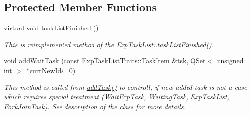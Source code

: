 \subsection*{Protected Member Functions}
\begin{DoxyCompactItemize}
\item 
virtual void \hyperlink{class_wait_task_list_aa0749dc369379ff737fdf14a89142bd2}{task\+List\+Finished} ()
\begin{DoxyCompactList}\small\item\em This is reimplemented method of the \hyperlink{class_exp_task_list_adee3f2e0894b5b102b2fcf0cff4ff25a}{Exp\+Task\+List\+::task\+List\+Finished()}. \end{DoxyCompactList}\item 
void \hyperlink{class_wait_task_list_a2724cb9d9e7f897a4bf0c44054ad2c29}{add\+Wait\+Task} (const \hyperlink{struct_exp_task_list_traits_1_1_task_item}{Exp\+Task\+List\+Traits\+::\+Task\+Item} \&tsk, Q\+Set$<$ unsigned int $>$ $\ast$curr\+New\+Ids=0)
\begin{DoxyCompactList}\small\item\em This method is called from \hyperlink{class_wait_task_list_a429d0b45f82a2eef00c5dacffbbc1f70}{add\+Task()} to controll, if new added task is not a case which requires special treatment (\hyperlink{class_wait_exp_task}{Wait\+Exp\+Task}, \hyperlink{class_waiting_task}{Waiting\+Task}, \hyperlink{class_exp_task_list}{Exp\+Task\+List}, \hyperlink{class_fork_join_task}{Fork\+Join\+Task}). See description of the class for more details. \end{DoxyCompactList}\end{DoxyCompactItemize}
